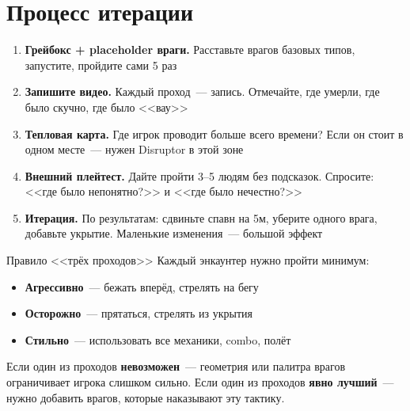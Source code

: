 \documentclass[a4paper,11pt]{report}
\begin{document}
\section{Процесс итерации}

\begin{enumerate}[leftmargin=*]
  \item \textbf{Грейбокс + placeholder враги.} Расставьте врагов
    базовых типов, запустите, пройдите сами 5 раз
  \item \textbf{Запишите видео.} Каждый проход~--- запись.
    Отмечайте, где умерли, где было скучно, где было <<вау>>
  \item \textbf{Тепловая карта.} Где игрок проводит больше всего
    времени? Если он стоит в одном месте~--- нужен Disruptor
    в этой зоне
  \item \textbf{Внешний плейтест.} Дайте пройти 3--5 людям без
    подсказок. Спросите: <<где было непонятно?>> и
    <<где было нечестно?>>
  \item \textbf{Итерация.} По результатам: сдвиньте спавн на 5м,
    уберите одного врага, добавьте укрытие. Маленькие изменения~---
    большой эффект
\end{enumerate}

\begin{tip}{Правило <<трёх проходов>>}
Каждый энкаунтер нужно пройти минимум:
\begin{itemize}
  \item \textbf{Агрессивно}~--- бежать вперёд, стрелять на бегу
  \item \textbf{Осторожно}~--- прятаться, стрелять из укрытия
  \item \textbf{Стильно}~--- использовать все механики, combo, полёт
\end{itemize}
Если один из проходов \textbf{невозможен}~--- геометрия или палитра
врагов ограничивает игрока слишком сильно.
Если один из проходов \textbf{явно лучший}~--- нужно добавить врагов,
которые наказывают эту тактику.
\end{tip}

\vspace{1cm}

\begin{center}
\end{center}
\end{document}
